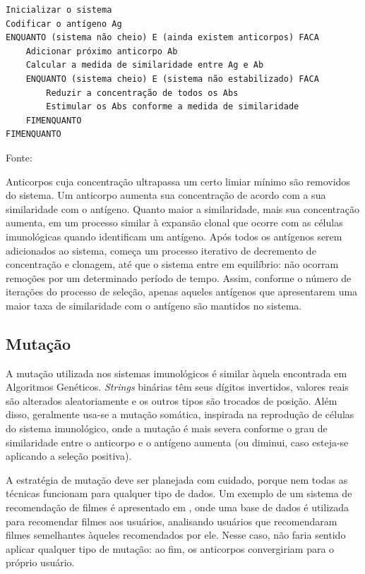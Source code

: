 \vspace{0.5cm}
\begin{lstlisting}[caption=Pseudo código de um Sistema Imunológico Artificial,label=lst:ais_aisalg]
Inicializar o sistema
Codificar o antígeno Ag
ENQUANTO (sistema não cheio) E (ainda existem anticorpos) FACA
    Adicionar próximo anticorpo Ab
    Calcular a medida de similaridade entre Ag e Ab
    ENQUANTO (sistema cheio) E (sistema não estabilizado) FACA
        Reduzir a concentração de todos os Abs
        Estimular os Abs conforme a medida de similaridade
    FIMENQUANTO
FIMENQUANTO
\end{lstlisting}
\vspace{0.25cm}
\centerline{Fonte: \cite{Aickelin2005}}
\vspace{0.5cm}

Anticorpos cuja concentração ultrapassa um certo limiar mínimo são removidos do sistema. Um anticorpo aumenta sua concentração de acordo com a sua similaridade com o antígeno. Quanto maior a similaridade, mais sua concentração aumenta, em um processo similar à expansão clonal que ocorre com as células imunológicas quando identificam um antígeno. Após todos os antígenos serem adicionados ao sistema, começa um processo iterativo de decremento de concentração e clonagem, até que o sistema entre em equilíbrio: não ocorram remoções por um determinado período de tempo. Assim, conforme o número de iterações do processo de seleção, apenas aqueles antígenos que apresentarem uma maior taxa de similaridade com o antígeno são mantidos no sistema.

\subsection{Mutação}

A mutação utilizada nos sistemas imunológicos é similar àquela encontrada em Algoritmos Genéticos. \emph{Strings} binárias têm seus dígitos invertidos, valores reais são alterados aleatoriamente e os outros tipos são trocados de posição. Além disso, geralmente usa-se a mutação somática, inspirada na reprodução de células do sistema imunológico, onde a mutação é mais severa conforme o grau de similaridade entre o anticorpo e o antígeno aumenta (ou diminui, caso esteja-se aplicando a seleção positiva).

A estratégia de mutação deve ser planejada com cuidado, porque nem todas as técnicas funcionam para qualquer tipo de dados. Um exemplo de um sistema de recomendação de filmes é apresentado em \citet{Aickelin2005}, onde uma base de dados é utilizada para recomendar filmes aos usuários, analisando usuários que recomendaram filmes semelhantes àqueles recomendados por ele. Nesse caso, não faria sentido aplicar qualquer tipo de mutação: ao fim, os anticorpos convergiriam para o próprio usuário.


